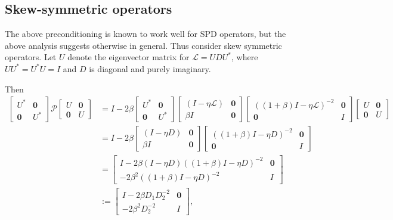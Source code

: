 \documentclass[a4paper,10pt]{article}
\begin{document}
\subsection{Skew-symmetric operators}

The above preconditioning is known to work well for SPD operators, but the above
analysis suggests otherwise in general. Thus consider skew symmetric operators.
Let $U$ denote the eigenvector matrix for $\mathcal{L} = UDU^*$, where
$UU^* = U^*U = I$ and $D$ is diagonal and purely imaginary. 


Then 
%
\begin{align*}
\begin{bmatrix} U^* & \mathbf{0} \\ \mathbf{0} & U^*\end{bmatrix}
	\mathcal{P}\begin{bmatrix} U & \mathbf{0} \\ \mathbf{0} & U\end{bmatrix} & =
I - 2\beta\begin{bmatrix} U^* & \mathbf{0} \\ \mathbf{0} & U^*\end{bmatrix}
	\begin{bmatrix} (I - \eta\mathcal{L}) & \mathbf{0} \\ 
	\beta I & \mathbf{0} \end{bmatrix}
	\begin{bmatrix} ((1+\beta)I - \eta\mathcal{L})^{-2} & \mathbf{0} \\
		\mathbf{0} & I \end{bmatrix}
	\begin{bmatrix} U & \mathbf{0} \\ \mathbf{0} & U\end{bmatrix} \\
& = I - 2\beta \begin{bmatrix} (I - \eta D) & \mathbf{0} \\ 
	\beta I & \mathbf{0} \end{bmatrix}
	\begin{bmatrix} ((1+\beta)I - \eta D)^{-2} & \mathbf{0} \\
		\mathbf{0} & I \end{bmatrix} \\
& = \begin{bmatrix} I - 2\beta(I - \eta D)((1+\beta)I - \eta D)^{-2} & \mathbf{0} \\ 
	-2\beta^2 ((1+\beta)I - \eta D)^{-2} & I \end{bmatrix} \\
& := \begin{bmatrix} I - 2\beta D_1D_2^{-2} & \mathbf{0} \\ -2\beta^2D_2^{-2} & I \end{bmatrix},
\end{align*}
\end{document}
